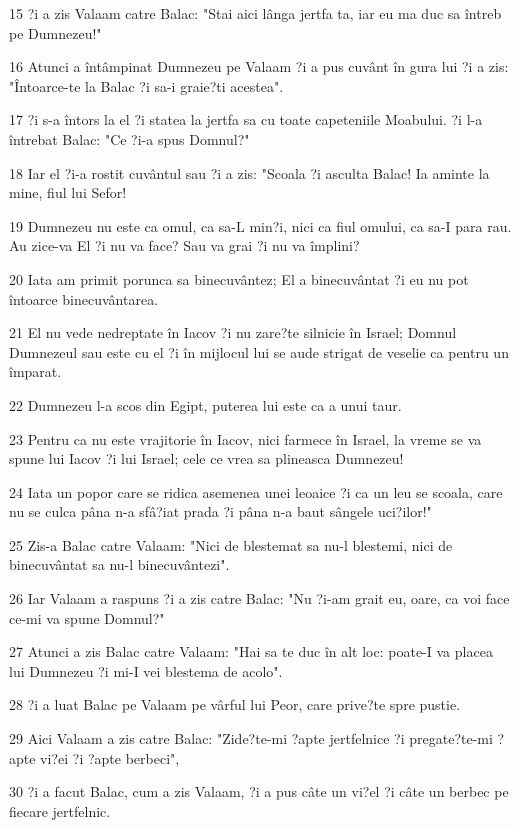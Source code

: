 \par 15 ?i a zis Valaam catre Balac: "Stai aici lânga jertfa ta, iar eu ma duc sa întreb pe Dumnezeu!"
\par 16 Atunci a întâmpinat Dumnezeu pe Valaam ?i a pus cuvânt în gura lui ?i a zis: "Întoarce-te la Balac ?i sa-i graie?ti acestea".
\par 17 ?i s-a întors la el ?i statea la jertfa sa cu toate capeteniile Moabului. ?i l-a întrebat Balac: "Ce ?i-a spus Domnul?"
\par 18 Iar el ?i-a rostit cuvântul sau ?i a zis: "Scoala ?i asculta Balac! Ia aminte la mine, fiul lui Sefor!
\par 19 Dumnezeu nu este ca omul, ca sa-L min?i, nici ca fiul omului, ca sa-I para rau. Au zice-va El ?i nu va face? Sau va grai ?i nu va împlini?
\par 20 Iata am primit porunca sa binecuvântez; El a binecuvântat ?i eu nu pot întoarce binecuvântarea.
\par 21 El nu vede nedreptate în Iacov ?i nu zare?te silnicie în Israel; Domnul Dumnezeul sau este cu el ?i în mijlocul lui se aude strigat de veselie ca pentru un împarat.
\par 22 Dumnezeu l-a scos din Egipt, puterea lui este ca a unui taur.
\par 23 Pentru ca nu este vrajitorie în Iacov, nici farmece în Israel, la vreme se va spune lui Iacov ?i lui Israel; cele ce vrea sa plineasca Dumnezeu!
\par 24 Iata un popor care se ridica asemenea unei leoaice ?i ca un leu se scoala, care nu se culca pâna n-a sfâ?iat prada ?i pâna n-a baut sângele uci?ilor!"
\par 25 Zis-a Balac catre Valaam: "Nici de blestemat sa nu-l blestemi, nici de binecuvântat sa nu-l binecuvântezi".
\par 26 Iar Valaam a raspuns ?i a zis catre Balac: "Nu ?i-am grait eu, oare, ca voi face ce-mi va spune Domnul?"
\par 27 Atunci a zis Balac catre Valaam: "Hai sa te duc în alt loc: poate-I va placea lui Dumnezeu ?i mi-I vei blestema de acolo".
\par 28 ?i a luat Balac pe Valaam pe vârful lui Peor, care prive?te spre pustie.
\par 29 Aici Valaam a zis catre Balac: "Zide?te-mi ?apte jertfelnice ?i pregate?te-mi ?apte vi?ei ?i ?apte berbeci",
\par 30 ?i a facut Balac, cum a zis Valaam, ?i a pus câte un vi?el ?i câte un berbec pe fiecare jertfelnic.

